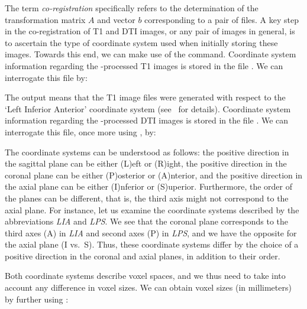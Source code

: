 The term \textit{co-registration} specifically refers to the
determination of the transformation matrix $A$ and vector $b$
corresponding to a pair of files. %
%
A key step in the co-registration of T1 and DTI images, or any pair
of images in general, is to ascertain the type of coordinate system
used when initially storing these images. Towards this end, we can
make use of the  command. Coordinate system
information regarding the {\freesurfer}-processed T1 images is stored
in the file . We can interrogate this file by:

\noindent The output  means that the T1 image files were
generated with respect to the `Left Inferior Anterior' coordinate
system (see~\cite{freesurfer-wiki} for details). Coordinate system
information regarding the {\freesurfer}-processed DTI images is stored
in the file . We can interrogate this file, once
more using , by:


The coordinate systems can be understood as follows: the positive
direction in the sagittal plane can be either (L)eft or (R)ight, the
positive direction in the coronal plane can be either (P)osterior or
(A)nterior, and the positive direction in the axial plane can be either
(I)nferior or (S)uperior. Furthermore, the order of the planes can be
different, that is, the third axis might not correspond to the axial
plane. For instance, let us examine the coordinate systems described
by the abbreviations \emph{LIA} and \emph{LPS}. We see that the coronal
plane corresponds to the third axes (A) in \emph{LIA} and second axes
(P) in \emph{LPS}, and we have the opposite for the axial plane (I
vs.~S). Thus, these coordinate systems differ by the choice of a 
positive direction in the coronal and axial planes, in addition to
their order.

Both coordinate systems describe voxel spaces, and we thus need to take into 
account any difference in voxel sizes. We can obtain voxel sizes (in millimeters) 
by further using : 

